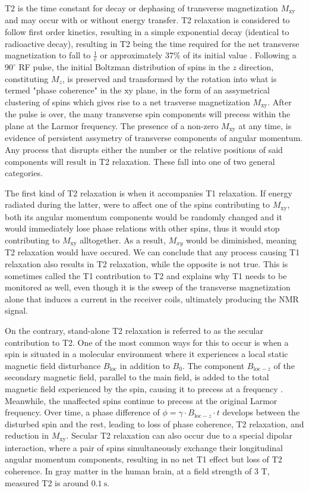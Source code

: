 T2 is the time constant for decay or dephasing of transverse magnetization $M_{\text{xy}}$ and may occur with or without energy transfer. T2 relaxation is considered to follow first order kinetics, resulting in a simple exponential decay (identical to radioactive decay), resulting in T2 being the time required for the net transverse magnetization to fall to $\frac{1}{e}$ or approximately $37\%$ of its initial value \cite{T2}. Following a $90^\circ$ \gls{RF} pulse, the initial Boltzman distribution of spins in the $z$ direction, constituting $M_z$, is preserved and transformed by the rotation into what is termed "phase coherence" in the $\text{xy}$ plane, in the form of an assymetrical clustering of spins which gives rise to a net trasverse magnetization $M_{\text{xy}}$. After the pulse is over, the many transverse spin components will precess within the plane at the Larmor frequency. The presence of a non-zero $M_{\text{xy}}$ at any time, is evidence of persistent assymetry of transverse components of angular momentum. Any process that disrupts either the number or the relative positions of said components will result in T2 relaxation. These fall into one of two general categories.

The first kind of T2 relaxation is when it accompanies T1 relaxation. If energy radiated during the latter, were to affect one of the spins contributing to $M_{\text{xy}}$, both its angular momentum components would be randomly changed and it would immediately lose phase relations with other spins, thus it would stop contributing to $M_{\text{xy}}$ alltogether. As a result, $M_{xy}$ would be diminished, meaning T2 relaxation would have occured. We can conclude that any process causing T1 relaxation also results in T2 relaxation, while the opposite is not true. This is sometimes called the T1 contribution to T2 and explains why T1 needs to be monitored as well, even though it is the sweep of the transverse magnetization alone that induces a current in the receiver coils, ultimately producing the \gls{NMR} signal.

On the contrary, stand-alone T2 relaxation is referred to as the secular contribution to T2. One of the most common ways for this to occur is when a spin is situated in a molecular environment where it experiences a local static magnetic field disturbance \( B_{\text{loc}} \) in addition to \( B_0 \). The component \( B_{\text{loc}-z} \) of the secondary magnetic field, parallel to the main field, is added to the total magnetic field experienced by the spin, causing it to precess at a frequency . Meanwhile, the unaffected spins continue to precess at the original Larmor frequency. Over time, a phase difference of \( \phi = \gamma \cdot B_{\text{loc}-z} \cdot t \) develops between the disturbed spin and the rest, leading to loss of phase coherence, T2 relaxation, and reduction in \( M_{\text{xy}} \). Secular T2 relaxation can also occur due to a special dipolar interaction, where a pair of spins simultaneously exchange their longitudinal angular momentum components, resulting in no net T1 effect but loss of T2 coherence. In gray matter in the human brain, at a field strength of 3 \si{\tesla}, measured T2 is around \( \SI{0.1}{\second} \).

